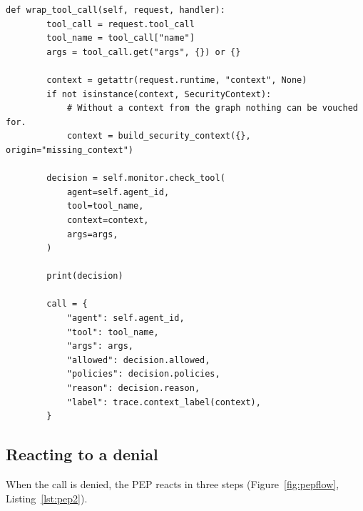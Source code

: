 \documentclass[11pt,a4paper]{article}
\begin{document}
\begin{lstlisting}[firstnumber=39,style=py,caption={PEP: asking the monitor (\texttt{security/authorization\_middleware.py}, lines 39--66)},label={lst:pep1}]
    def wrap_tool_call(self, request, handler):
        tool_call = request.tool_call
        tool_name = tool_call["name"]
        args = tool_call.get("args", {}) or {}

        context = getattr(request.runtime, "context", None)
        if not isinstance(context, SecurityContext):
            # Without a context from the graph nothing can be vouched for.
            context = build_security_context({}, origin="missing_context")

        decision = self.monitor.check_tool(
            agent=self.agent_id,
            tool=tool_name,
            context=context,
            args=args,
        )

        print(decision)

        call = {
            "agent": self.agent_id,
            "tool": tool_name,
            "args": args,
            "allowed": decision.allowed,
            "policies": decision.policies,
            "reason": decision.reason,
            "label": trace.context_label(context),
        }
\end{lstlisting}

\subsection{Reacting to a denial}

When the call is denied, the PEP reacts in three steps (Figure~\ref{fig:pepflow},
Listing~\ref{lst:pep2}).
\end{document}
